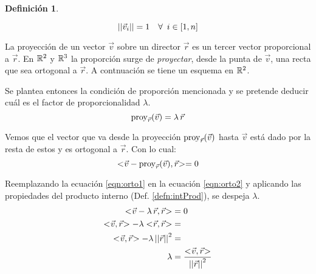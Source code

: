 \documentclass[a5paper,12pt,twoside]{book}
\newtheorem{defn}{{Definición}}[chapter]
\begin{document}
\begin{mdframed}[style=DefinitionFrame]
    \begin{defn}
    \end{defn}
    \begin{equation*}
        {\left|\left| {\Vec{v}_i} \right|\right|} = 1 \quad \forall \enspace  i \in [1,n]
    \end{equation*}
\end{mdframed}

La proyección de un vector $\Vec{v}$ sobre un director $\Vec{r}$ es un tercer vector proporcional a $\Vec{r}$.
En $\mathbb{R}^2$ y $\mathbb{R}^3$ la proporción surge de \emph{proyectar}, desde la punta de $\Vec{v}$, una recta que sea ortogonal a $\Vec{r}$.
A contnuación se tiene un esquema en $\mathbb{R}^2$.

\begin{center}
    \def\svgwidth{0.6\linewidth}
    
\end{center}

Se plantea entonces la condición de proporción mencionada y se pretende deducir cuál es el factor de proporcionalidad $\lambda$.
\begin{equation}
    \operatorname{proy}_{\Vec{r}}(\Vec{v}) = \lambda \, \Vec{r}
    \label{eqn:orto1}
\end{equation}

Vemos que el vector que va desde la proyección $\operatorname{proy}_{\Vec{r}}(\Vec{v})$ hasta $\Vec{v}$ está dado por la resta de estos y es ortogonal a $\Vec{r}$.
Con lo cual:
\begin{equation}
    <\hspace{-0.8mm}\Vec{v} - \operatorname{proy}_{\Vec{r}}(\Vec{v}),\Vec{r}\hspace{-0.8mm}> = 0
    \label{eqn:orto2}
\end{equation}

Reemplazando la ecuación \ref{eqn:orto1} en la ecuación \ref{eqn:orto2} y aplicando las propiedades del producto interno (Def. \ref{defn:intProd}), se despeja $\lambda$.
\begin{align*}
    \intProd{\Vec{v} - \lambda \, \Vec{r}}{\Vec{r}} &= 0
    \\
    \intProd{\Vec{v}}{\Vec{r}} - \lambda \intProd{\Vec{r}}{\Vec{r}} &=
    \\
    \intProd{\Vec{v}}{\Vec{r}} - \lambda \, \nnorm{\Vec{r}}^2 &=
    \\
    \lambda &= \frac{\intProd{\Vec{v}}{\Vec{r}}}{\nnorm{\Vec{r}}^2}
\end{align*}
\end{document}
